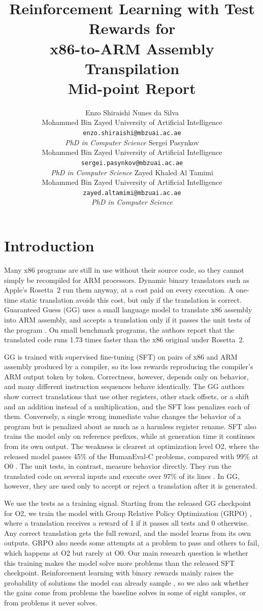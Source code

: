 \documentclass{article}
\title{Reinforcement Learning with Test Rewards for\\x86-to-ARM Assembly Transpilation\\\large Mid-point Report}
\author{%
  Enzo Shiraishi Nunes da Silva \\
  Mohammed Bin Zayed University of Artificial Intelligence \\
  \texttt{enzo.shiraishi@mbzuai.ac.ae} \\
  \textit{PhD in Computer Science}
  \And
  Sergei Pasynkov \\
  Mohammed Bin Zayed University of Artificial Intelligence \\
  \texttt{sergei.pasynkov@mbzuai.ac.ae} \\
  \textit{PhD in Computer Science}
  \And
  Zayed Khaled Al Tamimi \\
  Mohammed Bin Zayed University of Artificial Intelligence \\
  \texttt{zayed.altamimi@mbzuai.ac.ae} \\
  \textit{PhD in Computer Science}
}
\begin{document}
\maketitle
\draftlegend

\section{Introduction}

Many x86 programs are still in use without their source code, so they cannot simply be recompiled for ARM processors. Dynamic binary translators such as Apple's Rosetta~2 run them anyway, at a cost paid on every execution. A one-time static translation avoids this cost, but only if the translation is correct. Guaranteed Guess (GG) uses a small language model to translate x86 assembly into ARM assembly, and accepts a translation only if it passes the unit tests of the program \citep{gg}. On small benchmark programs, the authors report that the translated code runs 1.73 times faster than the x86 original under Rosetta~2.

GG is trained with supervised fine-tuning (SFT) on pairs of x86 and ARM assembly produced by a compiler, so its loss rewards reproducing the compiler's ARM output token by token. Correctness, however, depends only on behavior, and many different instruction sequences behave identically. The GG authors show correct translations that use other registers, other stack offsets, or a shift and an addition instead of a multiplication, and the SFT loss penalizes each of them. Conversely, a single wrong immediate value changes the behavior of a program but is penalized about as much as a harmless register rename. SFT also trains the model only on reference prefixes, while at generation time it continues from its own output. The weakness is clearest at optimization level O2, where the released model passes 45\% of the HumanEval-C problems, compared with 99\% at O0 \citep{gg}. The unit tests, in contrast, measure behavior directly. They run the translated code on several inputs and execute over 97\% of its lines \citep{gg}. In GG, however, they are used only to accept or reject a translation after it is generated.

We use the tests as a training signal. Starting from the released GG checkpoint for O2, we train the model with Group Relative Policy Optimization (GRPO) \citep{deepseekmath}, where a translation receives a reward of 1 if it passes all tests and 0 otherwise. Any correct translation gets the full reward, and the model learns from its own outputs. GRPO also needs some attempts at a problem to pass and others to fail, which happens at O2 but rarely at O0. Our main research question is whether this training makes the model solve more problems than the released SFT checkpoint. Reinforcement learning with binary rewards mainly raises the probability of solutions the model can already sample \citep{mroueh2025grpo}, so we also ask whether the gains come from problems the baseline solves in some of eight samples, or from problems it never solves.
\end{document}
